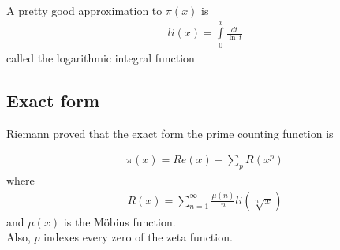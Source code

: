 \documentclass{article}
\begin{document}
A pretty good approximation to \(\pi(x)\) is
\begin{align*}
    li(x)=\int\limits_0^{x} \frac{dt}{\ln\,t}
\end{align*}
called the logarithmic integral function

\subsection{Exact form}

Riemann proved that the exact form the prime counting function is

\begin{align*}
    \pi(x)=Re(x)-\sum_{p}R(x^p)
\end{align*}
where
\begin{align*}
    R(x)=\sum_{n=1}^{\infty}\frac{\mu(n)}{n}li(\sqrt[n]{x})
\end{align*}
and \(\mu(x)\) is the Möbius function.\\
Also, \(p\) indexes every zero of the zeta function.
\end{document}
